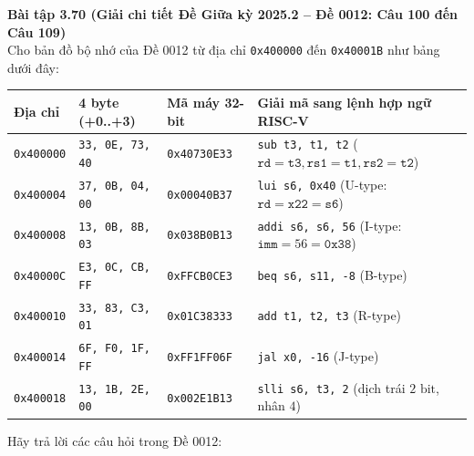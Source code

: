 \textbf{Bài tập 3.70 (Giải chi tiết Đề Giữa kỳ 2025.2 -- Đề 0012: Câu 100 đến Câu 109)}\\
Cho bản đồ bộ nhớ của Đề 0012 từ địa chỉ \texttt{0x400000} đến \texttt{0x40001B} như bảng dưới đây:
\begin{center}
\renewcommand{\arraystretch}{1.15}
\footnotesize
\begin{tabularx}{\linewidth}{|C{1.8cm}|C{3.1cm}|C{2.4cm}|Y|}
\hline
\textbf{Địa chỉ} & \textbf{4 byte (+0..+3)} & \textbf{Mã máy 32-bit} & \textbf{Giải mã sang lệnh hợp ngữ RISC-V} \\ \hline
\texttt{0x400000} & \texttt{33, 0E, 73, 40} & \texttt{0x40730E33} & \texttt{sub t3, t1, t2} ($\texttt{rd}=\texttt{t3}, \texttt{rs1}=\texttt{t1}, \texttt{rs2}=\texttt{t2}$) \\ \hline
\texttt{0x400004} & \texttt{37, 0B, 04, 00} & \texttt{0x00040B37} & \texttt{lui s6, 0x40} (U-type: $\texttt{rd}=\texttt{x22}=\texttt{s6}$) \\ \hline
\texttt{0x400008} & \texttt{13, 0B, 8B, 03} & \texttt{0x038B0B13} & \texttt{addi s6, s6, 56} (I-type: $\texttt{imm}=56=\texttt{0x38}$) \\ \hline
\texttt{0x40000C} & \texttt{E3, 0C, CB, FF} & \texttt{0xFFCB0CE3} & \texttt{beq s6, s11, -8} (B-type) \\ \hline
\texttt{0x400010} & \texttt{33, 83, C3, 01} & \texttt{0x01C38333} & \texttt{add t1, t2, t3} (R-type) \\ \hline
\texttt{0x400014} & \texttt{6F, F0, 1F, FF} & \texttt{0xFF1FF06F} & \texttt{jal x0, -16} (J-type) \\ \hline
\texttt{0x400018} & \texttt{13, 1B, 2E, 00} & \texttt{0x002E1B13} & \texttt{slli s6, t3, 2} (dịch trái $2\text{ bit}$, nhân $4$) \\ \hline
\end{tabularx}
\end{center}
Hãy trả lời các câu hỏi trong Đề 0012:
